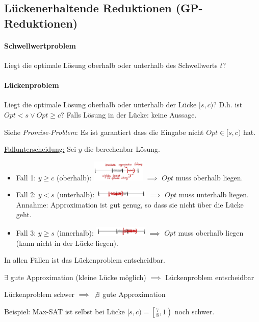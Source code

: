 \subsection{Lückenerhaltende Reduktionen (GP-Reduktionen)}

\paragraph{Schwellwertproblem}
Liegt die optimale Lösung oberhalb oder unterhalb des Schwellwerts $t$?

\paragraph{Lückenproblem}
Liegt die optimale Lösung oberhalb oder unterhalb der Lücke $[s,c)$? D.h. ist $Opt < s \vee Opt \geq c$?
Falls Lösung in der Lücke: keine Aussage.

Siehe \emph{Promise-Problem}: Es ist garantiert dass die Eingabe nicht $Opt \in [s, c)$ hat.

\underline{Fallunterscheidung:} Sei $y$ die berechenbar Lösung.
\begin{itemize}
    \item Fall 1: $y \geq c$ (oberhalb):
        \includegraphics[width=0.2\textwidth]{images/lueckenproblem-fall-1.jpg}
        $\implies$ $Opt$ muss oberhalb liegen.
    \item Fall 2: $y < s$ (unterhalb):
        \includegraphics[width=0.2\textwidth]{images/lueckenproblem-fall-2.jpg}
        $\implies$ $Opt$ muss unterhalb liegen. \\
        Annahme: Approximation ist gut genug, so dass sie nicht über die Lücke geht.
    \item Fall 3: $y \geq s$ (innerhalb):
        \includegraphics[width=0.2\textwidth]{images/lueckenproblem-fall-3.jpg}
        $\implies$ $Opt$ muss oberhalb liegen (kann nicht in der Lücke liegen).
\end{itemize}
In allen Fällen ist das Lückenproblem entscheidbar.
%
\begin{center}
    $\exists$ gute Approximation (kleine Lücke möglich) $\implies$ Lückenproblem entscheidbar

    Lückenproblem schwer $\implies$ $\not \exists$ gute Approximation
\end{center}
%
Beispiel:
Max-SAT ist selbst bei Lücke $ [s,c) = \left[ \frac{7}{8}, 1 \right) $ noch schwer.

